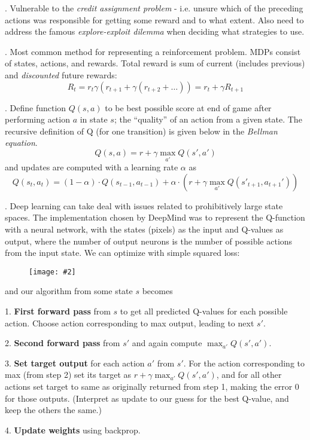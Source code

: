 \documentclass[12pt]{article}
\newcommand\myfig[2][0.3\textwidth]{\begin{figure}[h!]\centering\texttt{[image: \#2]}\end{figure}}
\newcommand{\myspace}{\vspace{2\bigskipamount}}
\newcommand\p{\Needspace{10\baselineskip} \noindent}
\begin{document}
\p {}. Vulnerable to the \textit{credit assignment problem} - i.e. unsure which of the preceding actions was responsible for getting some reward and to what extent. Also need to address the famous \textit{explore-exploit dilemma} when deciding what strategies to use. 


\myspace
\p {}. Most common method for representing a reinforcement problem. MDPs consist of states, actions, and rewards. Total reward is sum of current (includes previous) and \textit{discounted} future rewards:
\begin{equation}
	R_t = r_t \gamma(r_{t + 1}
	 + \gamma(r_{t + 2} + \ldots)) = r_t + \gamma R_{t + 1}
\end{equation}

\myspace
\p {}. Define function $Q(s, a)$ to be best possible score at end of game after performing action $a$ in state $s$; the ``quality'' of an action from a given state. The recursive definition of Q (for one transition) is given below in the \textit{Bellman equation}. 
$$ Q(s, a) = r + \gamma \max_{a'} Q(s', a') $$
and updates are computed with a learning rate $\alpha$ as
$$ Q(s_t, a_t) = (1 - \alpha)\cdot Q(s_{t -1}, a_{t - 1})
 + 	\alpha \cdot (r + \gamma \max_{a'} Q(s'_{t + 1}, a_{t+1}') ) $$
 
 \myspace
 \p {}. Deep learning can take deal with issues related to prohibitively large state spaces. The implementation chosen by DeepMind was to represent the Q-function with a neural network, with the states (pixels) as the input and Q-values as output, where the number of output neurons is the number of possible actions from the input state. We can optimize with simple squared loss:
 
 \myfig{DRL_loss.PNG}

and our algorithm from some state $s$ becomes
\begin{compactitem}
	\item[1.] \textbf{First forward pass} from $s$ to get all predicted Q-values for each possible action. Choose action corresponding to max output, leading to next $s'$.
	 
	\item[2.] \textbf{Second forward pass} from $s'$ and again compute $\max_{a'} Q(s', a')$. 
	
	\item[3.] \textbf{Set target output} for each action $a'$ from $s'$. For the action corresponding to max (from step 2) set its target as $r + \gamma \max_{a'} Q(s', a')$, and for all other actions set target to same as originally returned from step 1, making the error 0 for those outputs. (Interpret as update to our guess for the best Q-value, and keep the others the same.)
	
	\item[4.] \textbf{Update weights} using backprop. 
\end{compactitem}
\end{document}
